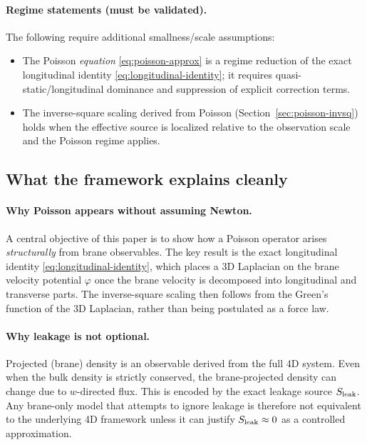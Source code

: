 \documentclass[11pt]{article}
\begin{document}
\paragraph{Regime statements (must be validated).}
The following require additional smallness/scale assumptions:
\begin{itemize}[leftmargin=2.0em]
\item The Poisson \emph{equation} \eqref{eq:poisson-approx} is a regime reduction of the exact longitudinal identity \eqref{eq:longitudinal-identity}; it requires quasi-static/longitudinal dominance and suppression of explicit correction terms.
\item The inverse-square scaling derived from Poisson (Section~\ref{sec:poisson-invsq}) holds when the effective source is localized relative to the observation scale and the Poisson regime applies.
\end{itemize}

\subsection{What the framework explains cleanly}
\label{sec:discussion-explains}

\paragraph{Why Poisson appears without assuming Newton.}
A central objective of this paper is to show how a Poisson operator arises \emph{structurally} from brane observables. The key result is the exact longitudinal identity \eqref{eq:longitudinal-identity}, which places a 3D Laplacian on the brane velocity potential $\varphi$ once the brane velocity is decomposed into longitudinal and transverse parts. The inverse-square scaling then follows from the Green's function of the 3D Laplacian, rather than being postulated as a force law.

\paragraph{Why leakage is not optional.}
Projected (brane) density is an observable derived from the full 4D system. Even when the bulk density is strictly conserved, the brane-projected density can change due to $w$-directed flux. This is encoded by the exact leakage source $S_{\rm leak}$. Any brane-only model that attempts to ignore leakage is therefore not equivalent to the underlying 4D framework unless it can justify $S_{\rm leak}\approx 0$ as a controlled approximation.
\end{document}

